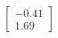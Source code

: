 \documentclass[preview]{standalone}
\begin{document}
\begin{align*}
\begin{bmatrix} -0.41 \\ 1.69 \end{bmatrix}
\end{align*}
\end{document}
